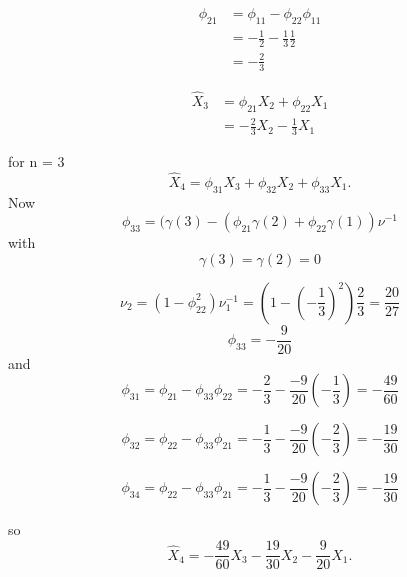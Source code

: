 \documentclass[11pt, oneside]{article}   	%
\begin{document}
 \begin{equation}
 \begin{split}
 \phi_{21} &= \phi_{11} - \phi_{22}\phi_{11}\\
 &= -\frac{1}{2}-\frac{1}{3}\frac{1}{2}\\
 & = -\frac{2}{3}
 \end{split}
 \end{equation}
 
 \begin{equation}
 \begin{split}
  \widehat{X}_{3}&=\phi_{21}X_{2} + \phi_{22}X_{1}\\
  &=-\frac{2}{3}X_{2}-\frac{1}{3}X_{1}
  \end{split}
 \end{equation}
 
for n = 3
\begin{equation}
\widehat{X}_{4} = \phi_{31}X_{3}+\phi_{32}X_{2}+\phi_{33}X_{1}.
\end{equation}
Now 
\begin{equation}
\phi_{33} = (\gamma(3)-(\phi_{21}\gamma(2)+\phi_{22}\gamma(1))\nu^{-1}
\end{equation}
with 
\begin{equation}
\gamma(3) = \gamma(2) = 0
\end{equation}

\begin{equation}
\nu_{2} = (1-\phi_{22}^{2})\nu_{1}^{-1} = \left(1-\left(-\frac{1}{3}\right)^{2}\right)\frac{2}{3}= \frac{20}{27}
\end{equation}
\begin{equation}
\phi_{33} = -\frac{9}{20}
\end{equation}
and 
\begin{equation}
\phi_{31} = \phi_{21} - \phi_{33}\phi_{22} = -\frac{2}{3}-\frac{-9}{20}\left(  -\frac{1}{3}\right) = -\frac{49}{60}
\end{equation}

\begin{equation}
\phi_{32} = \phi_{22} - \phi_{33}\phi_{21} = -\frac{1}{3}-\frac{-9}{20}\left(  -\frac{2}{3}\right) = -\frac{19}{30}
\end{equation}

\begin{equation}
\phi_{34} = \phi_{22} - \phi_{33}\phi_{21} = -\frac{1}{3}-\frac{-9}{20}\left(  -\frac{2}{3}\right) = -\frac{19}{30}
\end{equation}

so 
\begin{equation}
\widehat{X}_{4} = -\frac{49}{60}X_{3}-\frac{19}{30}X_{2}-\frac{9}{20}X_{1}.
\end{equation}
\end{document}
